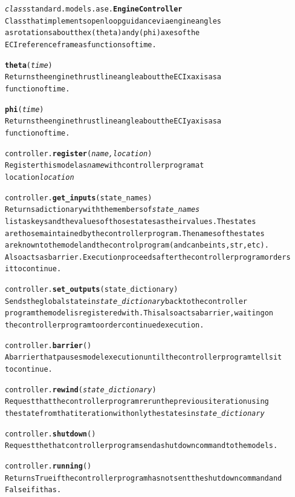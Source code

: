 \documentclass{book}
\begin{document}
\begin{alltt}
\emph{class} standard.models.ase.\textbf{EngineController}
  Class that implements open loop guidance via engine angles 
  as rotations about the x (theta) and y (phi) axes of the 
  ECI reference frame as functions of time.

  \textbf{theta}(\emph{time})
    Returns the engine thrust line angle about the ECI x axis as a 
    function of time.

  \textbf{phi}(\emph{time})
    Returns the engine thrust line angle about the ECI y axis as a 
    function of time.

controller.\textbf{register}( \emph{name, location} )
  Register this model as \emph{name} with controller program at 
  location \emph{location}

controller.\textbf{get_inputs}( state_names )
  Returns a dictionary with the members of \emph{state_names}
  list as keys and the values of those states as their values. The states
  are those maintained by the controller program. The names of the states
  are known to the model and the control program (and can be ints, str, etc).
  Also acts as barrier. Execution proceeds after the controller program orders 
  it to continue.

controller.\textbf{set_outputs}( state_dictionary )
  Sends the global state in \emph{state_dictionary} back to the controller
  program the model is registered with. This also acts a barrier, waiting on
  the controller program to order continued execution.

controller.\textbf{barrier}()
  A barrier that pauses model execution until the controller program tells it
  to continue.

controller.\textbf{rewind}(\emph{ state_dictionary })
  Request that the controller program rerun the previous iteration using
  the state from that iteration with only the states in \emph{state_dictionary}

controller.\textbf{shutdown}()
  Request the that controller program send a shutdown command to the models.

controller.\textbf{running}()
  Returns True if the controller program has not sent the shutdown command and
  False if it has.

\end{alltt}
\end{document}
